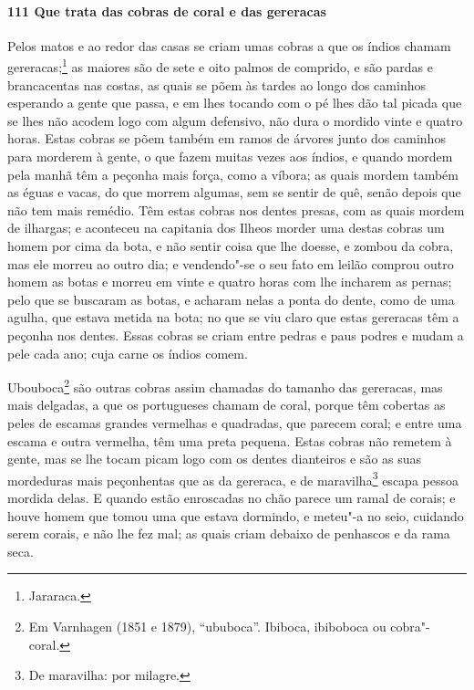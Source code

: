 \begin{linenumbers}
\paragraph{111 Que trata das cobras de coral e das gereracas}\quad
Pelos matos e ao redor das casas se criam umas cobras a que os índios chamam
gereracas;\footnote{ Jararaca.} as maiores são de sete e oito palmos de comprido, e são
pardas e brancacentas nas costas, as quais se põem às tardes ao longo dos caminhos
esperando a gente que passa, e em lhes tocando com o pé lhes dão tal picada que se lhes
não acodem logo com algum defensivo, não dura o mordido vinte e quatro horas. Estas cobras
se põem também em ramos de árvores junto dos caminhos para morderem à gente, o que fazem
muitas vezes aos índios, e quando mordem pela manhã têm a peçonha mais força, como a
víbora; as quais mordem também as éguas e vacas, do que morrem algumas, sem se sentir de
quê, senão depois que não tem mais remédio. Têm estas cobras nos dentes presas, com as
quais mordem de ilhargas; e aconteceu na capitania dos Ilheos morder uma destas cobras um
homem por cima da bota, e não sentir coisa que lhe doesse, e zombou da cobra, mas ele
morreu ao outro dia; e vendendo"-se o seu fato em leilão comprou outro homem as botas e
morreu em vinte e quatro horas com lhe incharem as pernas; pelo que se buscaram as botas, e
acharam nelas a ponta do dente, como de uma agulha, que estava metida na bota; no que se
viu claro que estas gereracas têm a peçonha nos dentes. Essas cobras se criam entre pedras
e paus podres e mudam a pele cada ano; cuja carne os índios comem.

Ubouboca\footnote{ Em Varnhagen (1851 e 1879), ``ububoca''. Ibiboca, ibiboboca ou
cobra"-coral.} são outras cobras assim chamadas do tamanho das gereracas, mas mais
delgadas, a que os portugueses chamam de coral, porque têm cobertas as peles de escamas
grandes vermelhas e quadradas, que parecem coral; e entre uma
escama e outra vermelha, têm uma preta pequena. Estas cobras não remetem à gente, mas se
lhe tocam picam logo com os dentes dianteiros e são as suas mordeduras mais peçonhentas
que as da gereraca, e de maravilha\footnote{ De maravilha: por milagre.} escapa pessoa
mordida delas. E quando estão enroscadas no chão parece um ramal de corais; e houve homem
que tomou uma que estava dormindo, e meteu"-a no seio, cuidando serem corais, e não lhe fez
mal; as quais criam debaixo de penhascos e da rama seca.


\end{linenumbers}
